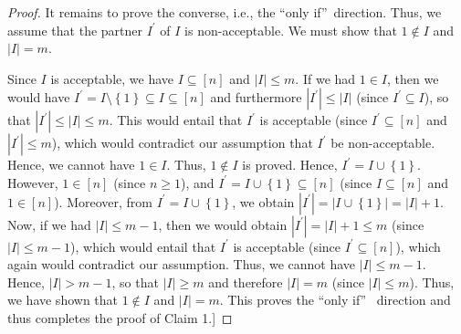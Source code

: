 \begin{proof}
It remains to prove the converse, i.e., the \textquotedblleft only
if\textquotedblright\ direction. Thus, we assume that the partner $I^{\prime}$
of $I$ is non-acceptable. We must show that $1\notin I$ and $\left\vert
I\right\vert =m$.

Since $I$ is acceptable, we have $I\subseteq\left[  n\right]  $ and
$\left\vert I\right\vert \leq m$. If we had $1\in I$, then we would have
$I^{\prime}=I\setminus\left\{  1\right\}  \subseteq I\subseteq\left[
n\right]  $ and furthermore $\left\vert I^{\prime}\right\vert \leq\left\vert
I\right\vert $ (since $I^{\prime}\subseteq I$), so that $\left\vert I^{\prime
}\right\vert \leq\left\vert I\right\vert \leq m$. This would entail that
$I^{\prime}$ is acceptable (since $I^{\prime}\subseteq\left[  n\right]  $ and
$\left\vert I^{\prime}\right\vert \leq m$), which would contradict our
assumption that $I^{\prime}$ be non-acceptable. Hence, we cannot have $1\in
I$. Thus, $1\notin I$ is proved. Hence, $I^{\prime}=I\cup\left\{  1\right\}
$. However, $1\in\left[  n\right]  $ (since $n\geq1$), and $I^{\prime}%
=I\cup\left\{  1\right\}  \subseteq\left[  n\right]  $ (since $I\subseteq
\left[  n\right]  $ and $1\in\left[  n\right]  $). Moreover, from $I^{\prime
}=I\cup\left\{  1\right\}  $, we obtain $\left\vert I^{\prime}\right\vert
=\left\vert I\cup\left\{  1\right\}  \right\vert =\left\vert I\right\vert +1$.
Now, if we had $\left\vert I\right\vert \leq m-1$, then we would obtain
$\left\vert I^{\prime}\right\vert =\left\vert I\right\vert +1\leq m$ (since
$\left\vert I\right\vert \leq m-1$), which would entail that $I^{\prime}$ is
acceptable (since $I^{\prime}\subseteq\left[  n\right]  $), which again would
contradict our assumption. Thus, we cannot have $\left\vert I\right\vert \leq
m-1$. Hence, $\left\vert I\right\vert >m-1$, so that $\left\vert I\right\vert
\geq m$ and therefore $\left\vert I\right\vert =m$ (since $\left\vert
I\right\vert \leq m$). Thus, we have shown that $1\notin I$ and $\left\vert
I\right\vert =m$. This proves the \textquotedblleft only if\textquotedblright%
\ direction and thus completes the proof of Claim 1.]


\end{proof}
